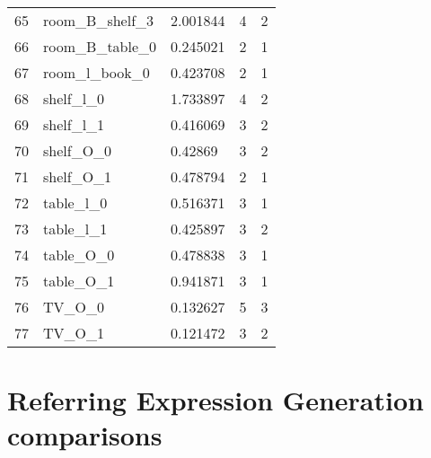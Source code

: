 \begin{longtable}{@{\zz\extracolsep{\fill}} l|llll}
65 & room\_B\_shelf\_3        & 2.001844 & 4 & 2 \\
66 & room\_B\_table\_0        & 0.245021 & 2 & 1 \\
67 & room\_l\_book\_0         & 0.423708 & 2 & 1 \\
68 & shelf\_l\_0              & 1.733897 & 4 & 2 \\
69 & shelf\_l\_1              & 0.416069 & 3 & 2 \\
70 & shelf\_O\_0              & 0.42869  & 3 & 2 \\
71 & shelf\_O\_1              & 0.478794 & 2 & 1 \\
72 & table\_l\_0              & 0.516371 & 3 & 1 \\
73 & table\_l\_1              & 0.425897 & 3 & 2 \\
74 & table\_O\_0              & 0.478838 & 3 & 1 \\
75 & table\_O\_1              & 0.941871 & 3 & 1 \\
76 & TV\_O\_0                 & 0.132627 & 5 & 3 \\
77 & TV\_O\_1                 & 0.121472 & 3 & 2 \\ \cline{1-4}
\end{longtable}

\section{Referring Expression Generation comparisons}


